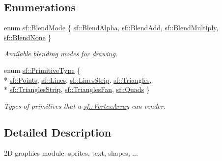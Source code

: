 \subsection*{Enumerations}
\begin{DoxyCompactItemize}
\item 
enum \hyperlink{group__graphics_ga80c52fe2f7050d7f7573b7ed3c995388}{sf\-::\-Blend\-Mode} \{ \hyperlink{group__graphics_gga80c52fe2f7050d7f7573b7ed3c995388aaf30f92cf1471a031fce5d61e8674996}{sf\-::\-Blend\-Alpha}, 
\hyperlink{group__graphics_gga80c52fe2f7050d7f7573b7ed3c995388afc35de7c9fe26776b839cfe0027b16da}{sf\-::\-Blend\-Add}, 
\hyperlink{group__graphics_gga80c52fe2f7050d7f7573b7ed3c995388a8adc43071db8f20e508c35e172195234}{sf\-::\-Blend\-Multiply}, 
\hyperlink{group__graphics_gga80c52fe2f7050d7f7573b7ed3c995388abe282fb5f49c20b6439cbec9d4f63722}{sf\-::\-Blend\-None}
 \}
\begin{DoxyCompactList}\small\item\em Available blending modes for drawing. \end{DoxyCompactList}\item 
enum \hyperlink{group__graphics_ga5ee56ac1339984909610713096283b1b}{sf\-::\-Primitive\-Type} \{ \\*
\hyperlink{group__graphics_gga5ee56ac1339984909610713096283b1bac7097d3e01778b9318def1f7ac35a785}{sf\-::\-Points}, 
\hyperlink{group__graphics_gga5ee56ac1339984909610713096283b1ba2bf015eeff9f798dfc3d6d744d669f1e}{sf\-::\-Lines}, 
\hyperlink{group__graphics_gga5ee56ac1339984909610713096283b1ba5b09910f5d0f39641342184ccd0d1de3}{sf\-::\-Lines\-Strip}, 
\hyperlink{group__graphics_gga5ee56ac1339984909610713096283b1ba880a7aa72c20b9f9beb7eb64d2434670}{sf\-::\-Triangles}, 
\\*
\hyperlink{group__graphics_gga5ee56ac1339984909610713096283b1ba66643dbbb24bbacb405973ed80eebae0}{sf\-::\-Triangles\-Strip}, 
\hyperlink{group__graphics_gga5ee56ac1339984909610713096283b1ba5338a2c6d922151fe50f235036af8a20}{sf\-::\-Triangles\-Fan}, 
\hyperlink{group__graphics_gga5ee56ac1339984909610713096283b1ba5041359b76b4bd3d3e6ef738826b8743}{sf\-::\-Quads}
 \}
\begin{DoxyCompactList}\small\item\em Types of primitives that a \hyperlink{classsf_1_1VertexArray}{sf\-::\-Vertex\-Array} can render. \end{DoxyCompactList}\end{DoxyCompactItemize}


\subsection{Detailed Description}
2\-D graphics module\-: sprites, text, shapes, ... 

